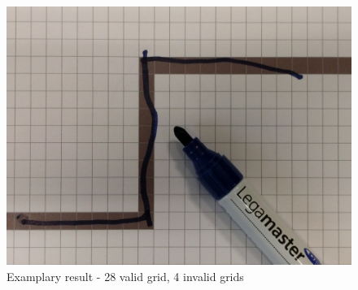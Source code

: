 \begin{figure}[h!]
\centering
\includegraphics[height = \textwidth/3]{./images/LFT_grid_example}
\caption{Examplary result - 28 valid grid, 4 invalid grids}
\end{figure}
